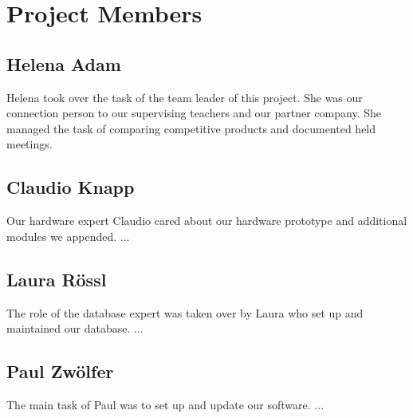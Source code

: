 \chapter*{Project Members}
\section*{Helena Adam}
Helena took over the task of the team leader of this project. She was our connection person to our supervising teachers and our partner company. She managed the task of comparing competitive products and documented held meetings.
\begin{center}
\end{center}
\section*{Claudio Knapp}
Our hardware expert Claudio cared about our hardware prototype and additional modules we appended. ...
\begin{center}
\end{center}
\section*{Laura Rössl}
The role of the database expert was taken over by Laura who set up and maintained our database. ...
\begin{center}
\end{center}
\section*{Paul Zwölfer}
The main task of Paul was to set up and update our software. ...
\begin{center}
\end{center}